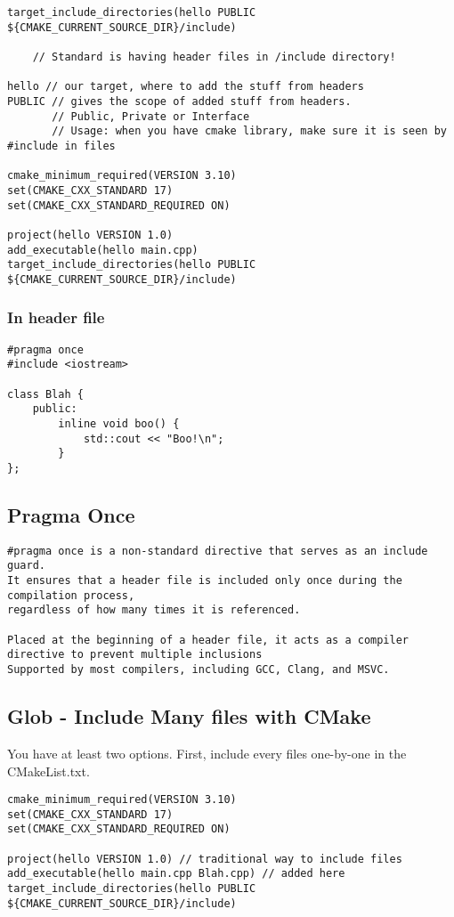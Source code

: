 \documentclass[openany]{report}
\begin{document}
\begin{verbatim}
target_include_directories(hello PUBLIC ${CMAKE_CURRENT_SOURCE_DIR}/include)

    // Standard is having header files in /include directory!

hello // our target, where to add the stuff from headers
PUBLIC // gives the scope of added stuff from headers. 
       // Public, Private or Interface
       // Usage: when you have cmake library, make sure it is seen by #include in files

cmake_minimum_required(VERSION 3.10)
set(CMAKE_CXX_STANDARD 17)
set(CMAKE_CXX_STANDARD_REQUIRED ON)

project(hello VERSION 1.0)
add_executable(hello main.cpp)
target_include_directories(hello PUBLIC ${CMAKE_CURRENT_SOURCE_DIR}/include)
\end{verbatim}

\subsubsection{In header file}

\begin{verbatim}
#pragma once
#include <iostream>

class Blah {
    public:
        inline void boo() {
            std::cout << "Boo!\n";
        }
};
\end{verbatim}

\subsection{Pragma Once}

\begin{verbatim}
#pragma once is a non-standard directive that serves as an include guard. 
It ensures that a header file is included only once during the compilation process,
regardless of how many times it is referenced.

Placed at the beginning of a header file, it acts as a compiler directive to prevent multiple inclusions
Supported by most compilers, including GCC, Clang, and MSVC.
\end{verbatim}

\subsection{Glob - Include Many files with CMake}
 
You have at least two options. First, include every files one-by-one in the CMakeList.txt.
\begin{verbatim}
cmake_minimum_required(VERSION 3.10)
set(CMAKE_CXX_STANDARD 17)
set(CMAKE_CXX_STANDARD_REQUIRED ON)

project(hello VERSION 1.0) // traditional way to include files
add_executable(hello main.cpp Blah.cpp) // added here
target_include_directories(hello PUBLIC ${CMAKE_CURRENT_SOURCE_DIR}/include)
\end{verbatim}
\end{document}
